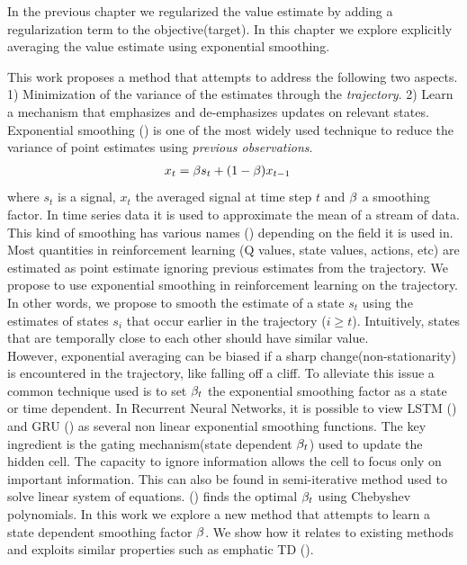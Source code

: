 
In the previous chapter we regularized the value estimate by adding a regularization term to the objective(target). In this chapter we explore explicitly averaging the value estimate using exponential smoothing.


This work proposes a method that attempts to address the following two aspects. 1) Minimization of the variance of the estimates through the \emph{trajectory}. 2) Learn a mechanism that emphasizes and de-emphasizes updates on relevant states.\\
Exponential smoothing (\cite{gardner1985exponential}) is one of the most widely used technique to reduce the variance of point estimates using \emph{previous observations}.
\begin{equation}
\begin{split}\label{smoothing}
    x_t &= \beta s_t + (1-\beta) x_{t-1}
\end{split}
\end{equation}
where $s_t$ is a signal, $x_t$ the averaged signal at time step $t$ and $\beta$ a smoothing factor.
In time series data it is used to approximate the mean of a stream of data. This kind of smoothing has various names (\cite{polyak1992acceleration,kingma2014adam}) depending on the field it is used in.  Most quantities in reinforcement learning (Q values, state values, actions, etc) are estimated as point estimate ignoring previous estimates from the trajectory. We propose to use exponential smoothing in reinforcement learning on the trajectory. In other words, we propose to smooth the estimate of a state $s_t$ using the estimates of states $s_i$ that occur earlier in the trajectory ($i\geq t$). Intuitively, states that are temporally close to each other should have similar value.\\
However, exponential averaging can be biased if a sharp change(non-stationarity) is encountered in the trajectory, like falling off a cliff. To alleviate this issue a common technique used is to set $\beta_t$ the exponential smoothing factor as a state or time dependent. In Recurrent Neural Networks, it is possible to view LSTM (\cite{hochreiter1997long}) and GRU (\cite{chung2014empirical}) as several non linear exponential smoothing functions. The key ingredient is the gating mechanism(state dependent $\beta_t$) used to update the hidden cell. The capacity to ignore information allows the cell to focus only on important information. This can also be found in semi-iterative method used to solve linear system of equations. (\cite{golub1961chebyshev}) finds the optimal $\beta_t$ using Chebyshev polynomials. In this work we explore a new method that attempts to learn a state dependent smoothing factor $\beta$. We show how it relates to existing methods and exploits similar properties such as emphatic TD (\cite{sutton2016emphatic,mahmood2015emphatic}). 





